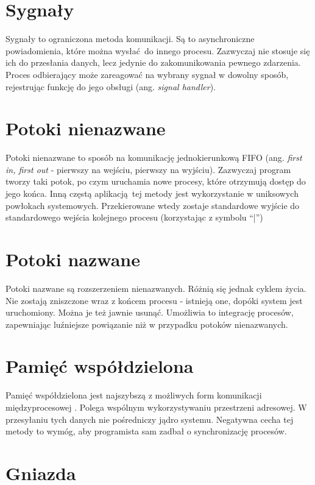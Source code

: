 \section{Sygnały}

Sygnały to ograniczona metoda komunikacji. Są to asynchroniczne powiadomienia, które można wysłać do innego procesu. Zazwyczaj nie stosuje się ich do przesłania danych, lecz jedynie do zakomunikowania pewnego zdarzenia. Proces odbierający może zareagować na wybrany sygnał w dowolny sposób, rejestrując funkcję do jego obsługi (ang. \textit{signal handler}).


\section{Potoki nienazwane}

Potoki nienazwane to sposób na komunikację jednokierunkową FIFO (ang. \textit{first in, first out} - pierwszy na wejściu, pierwszy na wyjściu). Zazwyczaj program tworzy taki potok, po czym uruchamia nowe procesy, które otrzymują dostęp do jego końca. Inną częstą aplikacją tej metody jest wykorzystanie w uniksowych powłokach systemowych. Przekierowane wtedy zostaje standardowe wyjście do standardowego wejścia kolejnego procesu (korzystając z symbolu \enquote{|})


\section{Potoki nazwane}

Potoki nazwane są rozszerzeniem nienazwanych. Różnią się jednak cyklem życia. Nie zostają zniszczone wraz z końcem procesu - istnieją one, dopóki system jest uruchomiony. Można je też jawnie usunąć. Umożliwia to integrację procesów, zapewniając luźniejsze powiązanie niż w przypadku potoków nienazwanych.


\section{Pamięć współdzielona}

Pamięć współdzielona jest najszybszą z możliwych form komunikacji międzyprocesowej \cite{Ste92}. Polega wspólnym wykorzystywaniu przestrzeni adresowej. W przesyłaniu tych danych nie pośredniczy jądro systemu. Negatywna cecha tej metody to wymóg, aby programista sam zadbał o synchronizację procesów.


\section{Gniazda}

